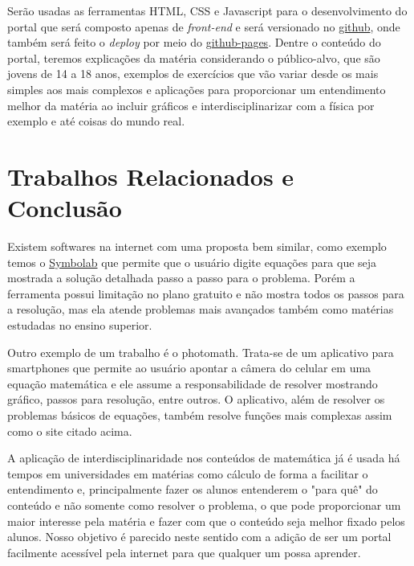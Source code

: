 \documentclass[12pt]{report}
\begin{document}
Serão usadas as ferramentas HTML, CSS e Javascript para o desenvolvimento do portal que será composto apenas de \textit{front-end} e será versionado no \href{https://github.com/Pedenite/PILC-eq}{github}, onde também será feito o \textit{deploy} por meio do \href{https://pedenite.github.io/PILC-eq/}{github-pages}. Dentre o conteúdo do portal, teremos explicações da matéria considerando o público-alvo, que são jovens de 14 a 18 anos, exemplos de exercícios que vão variar desde os mais simples aos mais complexos e aplicações para proporcionar um entendimento melhor da matéria ao incluir gráficos e interdisciplinarizar com a física por exemplo e até coisas do mundo real.

\section{Trabalhos Relacionados e Conclusão}
Existem softwares na internet com uma proposta bem similar, como exemplo temos o \href{https://pt.symbolab.com/}{Symbolab} que permite que o usuário digite equações para que seja mostrada a solução detalhada passo a passo para o problema. Porém a ferramenta possui limitação no plano gratuito e não mostra todos os passos para a resolução, mas ela atende problemas mais avançados também como matérias estudadas no ensino superior.

Outro exemplo de um trabalho é o photomath. Trata-se de um aplicativo para smartphones que permite ao usuário apontar a câmera do celular em uma equação matemática e ele assume a responsabilidade de resolver mostrando gráfico, passos para resolução, entre outros. O aplicativo, além de resolver os problemas básicos de equações, também resolve funções mais complexas assim como o site citado acima.

A aplicação de interdisciplinaridade nos conteúdos de matemática já é usada há tempos em universidades em matérias como cálculo de forma a facilitar o entendimento e, principalmente fazer os alunos entenderem o "para quê" do conteúdo e não somente como resolver o problema, o que pode proporcionar um maior interesse pela matéria e fazer com que o conteúdo seja melhor fixado pelos alunos. Nosso objetivo é parecido neste sentido com a adição de ser um portal facilmente acessível pela internet para que qualquer um possa aprender.
\end{document}
